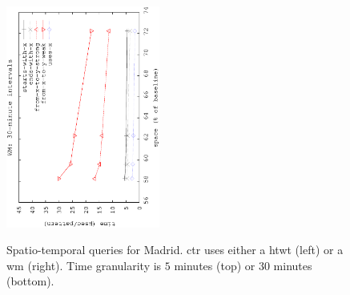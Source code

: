 \begin{figure}[!ht]
\begin{center}
			{\includegraphics[angle=-90,width=0.45\textwidth]{figures_synt/madrid_wm30.eps}}
			
		\end{center}
		\vspace{-0.3cm}
		\caption{Spatio-temporal queries for Madrid. \acrlong{ctr} uses either a \acrlong{htwt} (left) or a \acrlong{wm} (right). 
			Time granularity is $5$ minutes (top) or $30$ minutes (bottom). 
		}
		\label{fig:madridst}
		\vspace{-0.3cm}




\end{figure}
